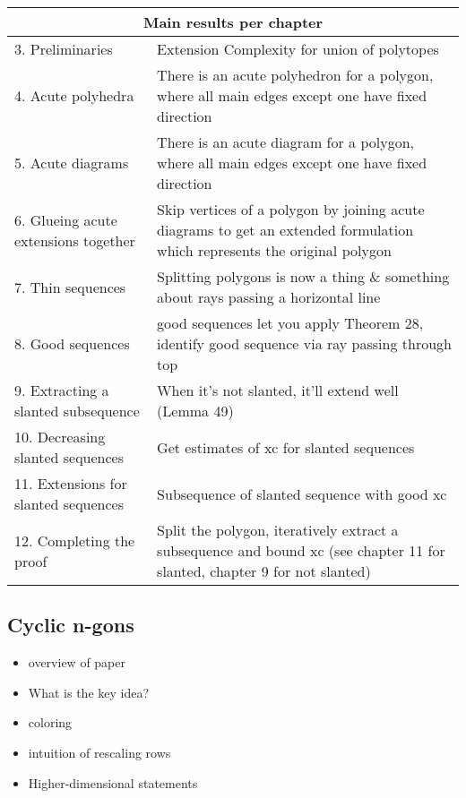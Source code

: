\begin{tabular}{| p{50mm} | p{100mm} |}
  \hline
  \multicolumn{2}{|c|}{\textbf{Main results per chapter}}\\ \hline
  3. Preliminaries & Extension Complexity for union of polytopes \\ \hline
  4. Acute polyhedra & There is an acute polyhedron for a polygon, where all main edges except one have fixed direction \\ \hline
  5. Acute diagrams & There is an acute diagram for a polygon, where all main edges except one have fixed direction \\ \hline
  6. Glueing acute extensions together & Skip vertices of a polygon by joining acute diagrams to get an extended formulation which represents the original polygon \\ \hline
  7. Thin sequences & Splitting polygons is now a thing \& something about rays passing a horizontal line \\ \hline
  8. Good sequences & good sequences let you apply Theorem 28, identify good sequence via ray passing through top \\ \hline
  9. Extracting a slanted subsequence & When it's not slanted, it'll extend well (Lemma 49) \\ \hline
  10. Decreasing slanted sequences & Get estimates of xc for slanted sequences \\ \hline
  11. Extensions for slanted sequences & Subsequence of slanted sequence with good xc \\ \hline
  12. Completing the proof & Split the polygon, iteratively extract a subsequence and bound xc (see chapter 11 for slanted, chapter 9 for not slanted) \\ \hline
\end{tabular}



\subsection{Cyclic n-gons}

\begin{itemize}
  \item overview of paper
  \item What is the key idea?
  \item coloring
  \item intuition of rescaling rows
  \item Higher-dimensional statements
\end{itemize}




